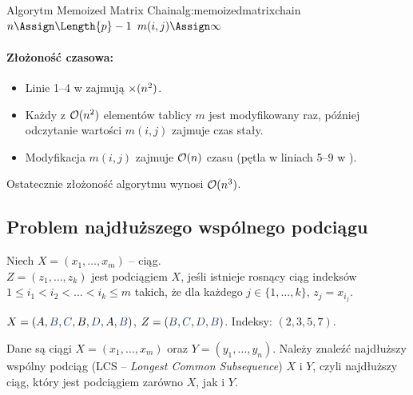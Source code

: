 \begin{alg}{Algorytm Memoized Matrix Chain}{alg:memoizedmatrixchain}
	\State $n \Assign \Length{p} - 1$
	\State $m(i, j) \Assign \infty$
	\EndFor
	\EndFor
	\State \Return {}
	\EndFunction
\end{alg}

\paragraph{Złożoność czasowa:}
\begin{itemize}
	\item Linie 1--4 w  zajmują $\mathcal{\Theta}(n^2)$.
	\item Każdy z $\mathcal{O}(n^2)$ elementów tablicy $m$ jest modyfikowany raz, później odczytanie wartości $m(i, j)$ zajmuje czas stały.
	\item Modyfikacja $m(i, j)$ zajmuje $\mathcal{O}(n)$ czasu (pętla w liniach 5--9 w ).
\end{itemize}
Ostatecznie złożoność algorytmu wynosi $\mathcal{O}(n^3)$.


\subsection{Problem najdłuższego wspólnego podciągu}

Niech $X = (x_1, \dots, x_m)$ -- ciąg. \\
$Z = (z_1, \dots, z_k)$ jest podciągiem $X$, jeśli istnieje rosnący ciąg indeksów $1 \leq i_1 < i_2 < \dots < i_k \leq m$ takich, że dla każdego $j \in \{1, \dots, k\}$, $z_j = x_{i_j}$.

\begin{example}[Podciąg]
	$X = (A, {\color{accent}B}, {\color{accent}C}, B, {\color{accent}D}, A, {\color{accent}B})$, $Z =
		({\color{accent}B}, {\color{accent}C}, {\color{accent}D}, {\color{accent}B})$.
	Indeksy: $(2, 3, 5, 7)$.
\end{example}

\begin{problem}
	Dane są ciągi $X = (x_1, \dots, x_m)$ oraz $Y = (y_1, \dots, y_n)$.
	Należy znaleźć najdłuższy wspólny podciąg (LCS -- \textit{Longest Common Subsequence}) $X$ i $Y$, czyli najdłuższy ciąg, który jest podciągiem zarówno $X$, jak i $Y$.
\end{problem}

